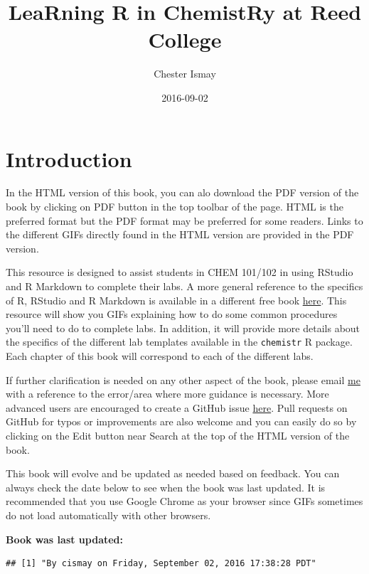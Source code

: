 \documentclass[]{tufte-book}
\title{LeaRning R in ChemistRy at Reed College}
\author{Chester Ismay}
\date{2016-09-02}
\begin{document}
\maketitle



{
\setcounter{tocdepth}{1}
\tableofcontents
}

\chapter{Introduction}\label{intro}

In the HTML version of this book, you can alo download the PDF version
of the book by clicking on PDF button in the top toolbar of the page.
HTML is the preferred format but the PDF format may be preferred for
some readers. Links to the different GIFs directly found in the HTML
version are provided in the PDF version.

This resource is designed to assist students in CHEM 101/102 in using
RStudio and R Markdown to complete their labs. A more general reference
to the specifics of R, RStudio and R Markdown is available in a
different free book \href{http://ismayc.github.io/rbasics-book}{here}.
This resource will show you GIFs explaining how to do some common
procedures you'll need to do to complete labs. In addition, it will
provide more details about the specifics of the different lab templates
available in the \texttt{chemistr} R package. Each chapter of this book
will correspond to each of the different labs.

If further clarification is needed on any other aspect of the book,
please email \href{mailto:cismay@reed.edu}{me} with a reference to the
error/area where more guidance is necessary. More advanced users are
encouraged to create a GitHub issue
\href{https://github.com/ismayc/rbasics/issues}{here}. Pull requests on
GitHub for typos or improvements are also welcome and you can easily do
so by clicking on the Edit button near Search at the top of the HTML
version of the book.

This book will evolve and be updated as needed based on feedback. You
can always check the date below to see when the book was last updated.
It is recommended that you use Google Chrome as your browser since GIFs
sometimes do not load automatically with other browsers.

\textbf{Book was last updated:}

\begin{verbatim}
## [1] "By cismay on Friday, September 02, 2016 17:38:28 PDT"
\end{verbatim}
\end{document}
